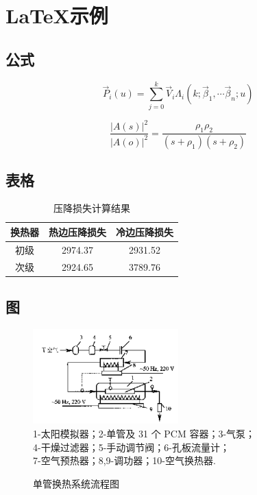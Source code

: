 \chapter{\LaTeX 示例}
\section{公式}
\begin{equation}
\vec{P}_{i}(u)=\sum_{j=0}^{k} \vec{V}_{i} \Lambda_{i}\left(k ; \vec{\beta}_{1}, \cdots \vec{\beta}_{n} ; u\right)
\end{equation}

\begin{equation}
\frac{|A(s)|^{2}}{|A(o)|^{2}}=\frac{\rho_{1} \rho_{2}}{\left(s+\rho_{1}\right)\left(s+\rho_{2}\right)}
\end{equation}

\section{表格}

\begin{table}[h]
\centering
\caption{压降损失计算结果}
\label{table:jiangya}
\begin{tabularx}{\textwidth}{CCC}
\toprule[2pt]
换热器&热边压降损失&冷边压降损失\\
\midrule[1pt]
初级&2974.37&2931.52\\
次级&2924.65&3789.76\\
\bottomrule[2pt]
\end{tabularx}
\end{table}

\section{图}


\begin{figure}[!h]
\centering
\includegraphics[width=0.5\textwidth]{figures/danguan}\\
\footnotesize
1-太阳模拟器；2-单管及 31 个 PCM 容器；3-气泵；\\
4-干燥过滤器；5-手动调节阀；6-孔板流量计；\\
7-空气预热器；8,9-调功器；10-空气换热器.\\
\caption{单管换热系统流程图}
\label{fig:danguan}
\end{figure}



